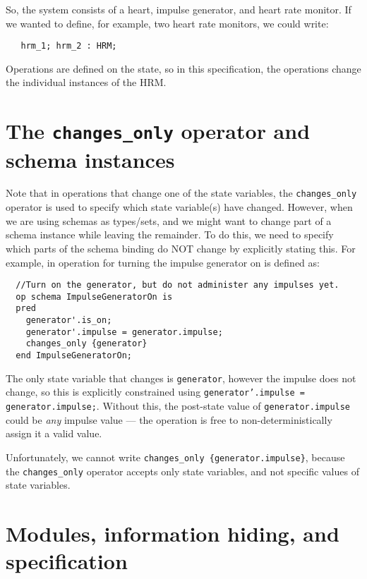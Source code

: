 \documentclass{article}
\begin{document}
So, the system consists of a heart, impulse generator, and heart rate monitor. If we wanted to define, for example, two heart rate monitors, we could write:

\begin{lstlisting}
   hrm_1; hrm_2 : HRM;
\end{lstlisting}

Operations are defined on the state, so in this specification, the operations change the individual instances of the HRM.

\section*{The {\large {\texttt{changes\_only}}} operator and schema instances}

Note that in operations that change one of the state variables, the \texttt{changes\_only} operator is used to specify which state variable(s) have changed. However, when we are using schemas as types/sets, and we might want to change part of a schema instance while leaving the remainder. To do this, we need to specify which parts of the schema binding do NOT change by explicitly stating this. For example, in operation for turning the impulse generator on is defined as:

\begin{lstlisting}
  //Turn on the generator, but do not administer any impulses yet.
  op schema ImpulseGeneratorOn is
  pred
    generator'.is_on;
    generator'.impulse = generator.impulse;
    changes_only {generator}
  end ImpulseGeneratorOn;
\end{lstlisting}

The only state variable that changes is \texttt{generator}, however the impulse does not change, so this is explicitly constrained using \texttt{generator'.impulse = generator.impulse;}. Without this, the post-state value of \texttt{generator.impulse} could be \emph{any} impulse value --- the operation is free to non-deterministically assign it a valid value.

Unfortunately, we cannot write  \texttt{changes\_only \{generator.impulse\}}, because the \texttt{changes\_only} operator accepts only state variables, and not specific values of state variables.

\section*{Modules, information hiding, and specification}
\end{document}
